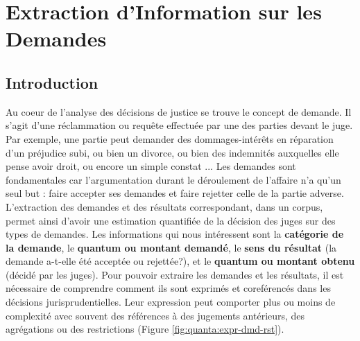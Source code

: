 %
\chapter{Extraction d'Information sur les Demandes}
\label{sec:quanta}

\section{Introduction}
\label{sec:quanta:introduction}
Au coeur de l'analyse des décisions de justice se trouve le concept de demande. Il s'agit d'une réclammation ou requête effectuée par une des parties devant le juge. Par exemple, une partie peut demander des dommages-intérêts en réparation d'un préjudice subi, ou bien un divorce, ou bien des indemnités auxquelles elle pense avoir droit, ou encore un simple constat ... Les demandes sont fondamentales car l'argumentation durant le déroulement de l'affaire n'a qu'un seul but : faire accepter ses demandes et faire rejetter celle de la partie adverse. L'extraction des demandes et des résultats correspondant, dans un corpus, permet ainsi d'avoir une estimation quantifiée de la décision des juges sur des types de demandes. Les informations qui nous intéressent sont la \textbf{catégorie de la demande}, le \textbf{quantum ou montant demandé}, le \textbf{sens du résultat} (la demande a-t-elle été acceptée ou rejettée?), et le \textbf{quantum ou montant obtenu} (décidé par les juges). Pour pouvoir extraire les demandes et les résultats, il est nécessaire de comprendre comment ils sont exprimés et coreférencés dans les décisions jurisprudentielles. Leur expression peut comporter plus ou moins de complexité avec souvent des références à des jugements antérieurs, des agrégations ou des restrictions (Figure \ref{fig:quanta:expr-dmd-rst}).

